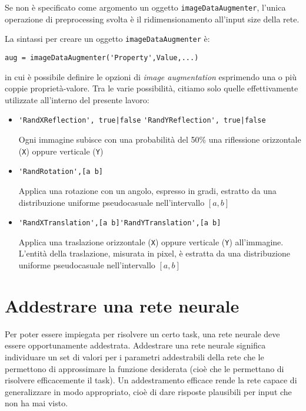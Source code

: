 Se non è specificato come argomento un oggetto \verb|imageDataAugmenter|, l'unica operazione di preprocessing svolta è il ridimensionamento all'input size della rete.

La sintassi per creare un oggetto \verb|imageDataAugmenter| è:

\begin{verbatim}
aug = imageDataAugmenter('Property',Value,...)
\end{verbatim}

in cui è possibile definire le opzioni di \textit{image augmentation} esprimendo una o più coppie proprietà-valore. Tra le varie possibilità, citiamo solo quelle effettivamente utilizzate all'interno del presente lavoro:
\begin{itemize}
	\item \verb+'RandXReflection', true|false+ \newline\vspace{0.1mm}\verb+'RandYReflection', true|false+
	
	Ogni immagine subisce con una probabilità del 50\% una riflessione orizzontale (\verb|X|) oppure verticale (\verb|Y|)
	\item \verb|'RandRotation',[a b]|
	
	Applica una rotazione con un angolo, espresso in gradi, estratto da una distribuzione uniforme pseudocasuale nell'intervallo $[a,b]$
	\item \verb|'RandXTranslation',[a b]|\newline\vspace{0.1mm}\verb|'RandYTranslation',[a b]|
	
	Applica una traslazione orizzontale (\verb|X|) oppure verticale (\verb|Y|) all'immagine. L'entità della traslazione, misurata in pixel, è estratta da una distribuzione uniforme pseudocasuale nell'intervallo $[a,b]$
\end{itemize}

\section{Addestrare una rete neurale}
Per poter essere impiegata per risolvere un certo task, una rete neurale deve essere opportunamente addestrata. Addestrare una rete neurale significa individuare un set di valori per i parametri addestrabili della rete che le permettono di approssimare la funzione desiderata (cioè che le permettano di risolvere efficacemente il task).
Un addestramento efficace rende la rete capace di generalizzare in modo appropriato, cioè di dare risposte plausibili per input che non ha mai visto.\\

